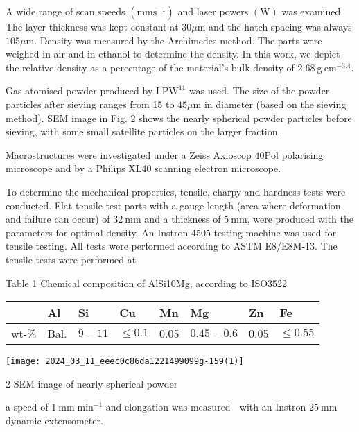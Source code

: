 \documentclass[10pt]{article}
\begin{document}
A wide range of scan speeds $\left(\mathrm{mm} \mathrm{s}^{-1}\right)$ and laser powers $(\mathrm{W})$ was examined. The layer thickness was kept constant at $30 \mu \mathrm{m}$ and the hatch spacing was always $105 \mu \mathrm{m}$. Density was measured by the Archimedes method. The parts were weighed in air and in ethanol to determine the density. In this work, we depict the relative density as a percentage of the material's bulk density of $2.68 \mathrm{~g} \mathrm{~cm}^{-3.4}$.

Gas atomised powder produced by $\mathrm{LPW}^{11}$ was used. The size of the powder particles after sieving ranges from 15 to $45 \mu \mathrm{m}$ in diameter (based on the sieving method). SEM image in Fig. 2 shows the nearly spherical powder particles before sieving, with some small satellite particles on the larger fraction.

Macrostructures were investigated under a Zeiss Axioscop $40 \mathrm{Pol}$ polarising microscope and by a Philips XL40 scanning electron microscope.

To determine the mechanical properties, tensile, charpy and hardness tests were conducted. Flat tensile test parts with a gauge length (area where deformation and failure can occur) of $32 \mathrm{~mm}$ and a thickness of $5 \mathrm{~mm}$, were produced with the parameters for optimal density. An Instron 4505 testing machine was used for tensile testing. All tests were performed according to ASTM E8/E8M-13. The tensile tests were performed at

Table 1 Chemical composition of AlSi10Mg, according to ISO3522

\begin{center}
\begin{tabular}{llllllll}
\hline
 & Al & Si & Cu & Mn & Mg & Zn & Fe \\
\hline
wt-\% & Bal. & $9-11$ & $\leq 0.1$ & 0.05 & $0.45-0.6$ & 0.05 & $\leq 0.55$ \\
\hline
\end{tabular}
\end{center}

\begin{center}
\texttt{[image: 2024\_03\_11\_eeec0c86da1221499099g-159(1)]}
\end{center}

2 SEM image of nearly spherical powder

a speed of $1 \mathrm{~mm} \mathrm{\operatorname {min } ^ { - 1 } \text { and elongation was measured }}$ with an Instron $25 \mathrm{~mm}$ dynamic extensometer.
\end{document}
